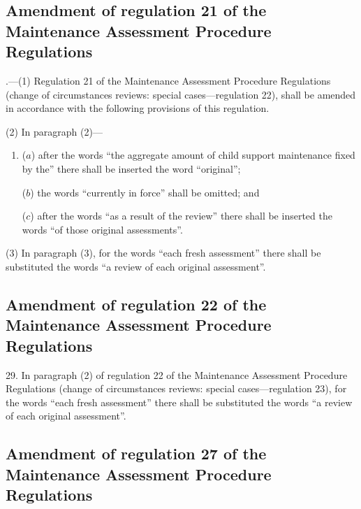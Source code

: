 \documentclass[a4paper]{article}
\begin{document}
\subsection[28. Amendment of regulation 21 of the Maintenance Assessment Procedure Regulations]{Amendment of regulation 21 of the Maintenance Assessment Procedure Regulations}

\begin{sloppypar}.—(1) Regulation 21 of the Maintenance Assessment Procedure Regulations (change of circumstances reviews: special cases—regulation 22), shall be amended in accordance with the following provisions of this regulation.
\end{sloppypar}

(2) In paragraph (2)—
\begin{enumerate}\item[]
($a$) after the words “the aggregate amount of child support maintenance fixed by the” there shall be inserted the word “original”;

($b$) the words “currently in force” shall be omitted; and

($c$) after the words “as a result of the review” there shall be inserted the words “of those original assessments”.
\end{enumerate}

(3) In paragraph (3), for the words “each fresh assessment” there shall be substituted the words “a review of each original assessment”.

\subsection[29. Amendment of regulation 22 of the Maintenance Assessment Procedure Regulations]{Amendment of regulation 22 of the Maintenance Assessment Procedure Regulations}

29.  In paragraph (2) of regulation 22 of the Maintenance Assessment Procedure Regulations (change of circumstances reviews: special cases—regulation 23), for the words “each fresh assessment” there shall be substituted the words “a review of each original assessment”.

\subsection[30. Amendment of regulation 27 of the Maintenance Assessment Procedure Regulations]{Amendment of regulation 27 of the Maintenance Assessment Procedure Regulations}
\end{document}
